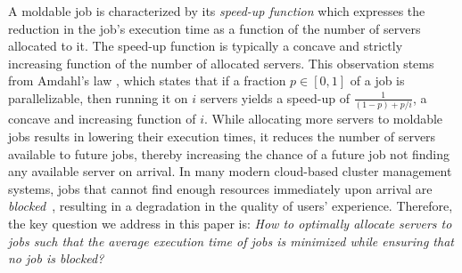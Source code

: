 \documentclass[a4paper]{article}
\theoremstyle{plain}
\theoremstyle{definition}
\theoremstyle{case}
\theoremstyle{remark}
\begin{document}
A moldable job is characterized by its {\em speed-up function} which expresses the reduction in the job's execution time as a function of the number of servers allocated to it. The speed-up function is typically a concave and strictly increasing function of the number of allocated servers. 
This observation stems from Amdahl's law \cite{Amdahl's_law_2008}, which states that if a fraction $p\in [0,1]$ of a job is parallelizable, then running it on $i$ servers yields a speed-up of $\frac{1}{(1-p)+p/i}$, a concave and increasing function of $i$. 
While allocating more servers to moldable jobs results in lowering their execution times, it reduces the number of servers available to future jobs, thereby increasing the chance of a future job not finding any available server on arrival. In many modern cloud-based cluster management systems, jobs that cannot find enough resources immediately upon arrival are {\em blocked}~\cite{Google_Borg_2015,autopilot_google}, resulting in a degradation in the quality of users' experience. 
Therefore, the key question we address in this paper is:
{\em How to optimally allocate servers to jobs such that the average execution time of jobs is minimized while ensuring that no job is blocked?}   


\end{document}
